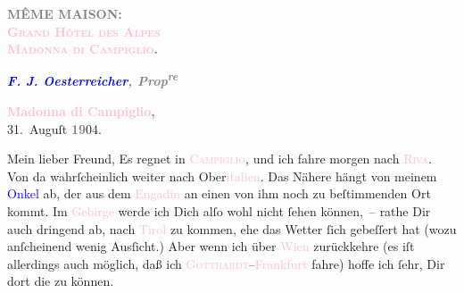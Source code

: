 \pstart
           \textcolor{gray}{\textbf{MÊME MAISON:}}{\\}\textcolor{gray}{\textbf{\textsc{\textcolor{pink}{Grand Hôtel des Alpes}{}\ledrightnote{\textcolor{pink}{Grand Hotel des Alpes}}}}}{\\}\textcolor{gray}{\textbf{\textsc{\textcolor{pink}{Madonna di Campiglio}{}\ledrightnote{\textcolor{pink}{Madonna di Campiglio}}.}}}\pend
           
\pstart
           \textcolor{gray}{\textbf{\emph{\textcolor{blue}{F. J. Oesterreicher}{}\ledrightnote{\textcolor{blue}{Franz Joseph Österreicher}}, Prop\textsuperscript{re}}}}\pend
           
\pstart
           \raggedleft{}\textcolor{gray}{\textbf{\textbf{\textcolor{pink}{Madonna di Campiglio}{}\ledrightnote{\textcolor{pink}{Madonna di Campiglio}}},}}{\\}31. Auguſt \textcolor{gray}{\textbf{19}}04.\pend
           
\pstart\center{}Mein lieber Freund,\pend
\pstart
           Es regnet in \textsc{\textcolor{pink}{Campiglio}{}\ledrightnote{\textcolor{pink}{Madonna di Campiglio}}}, und ich fahre morgen nach \textsc{\textcolor{pink}{Riva}{}\ledrightnote{\textcolor{pink}{Riva del Garda}}}. Von da wahrſcheinlich weiter nach Ober\textcolor{pink}{italien}{}\ledrightnote{\textcolor{pink}{Italien}}. Das Nähere hängt von meinem \textcolor{blue}{Onkel}{}\ledrightnote{{$\rightarrow$}\textcolor{blue}{Fedor Mamroth}} ab, der aus dem \textcolor{pink}{Engadin}{}\ledrightnote{\textcolor{pink}{Engadin}} an einen von ihm noch zu beſtimmenden Ort kommt. Im \textcolor{pink}{Gebirge}{}\ledrightnote{{$\rightarrow$}\textcolor{pink}{Dolomiten}} werde ich Dich alſo wohl nicht
               ſehen können, – rathe Dir auch {\pb}dringend ab, nach \textcolor{pink}{Tirol}{}\ledrightnote{\textcolor{pink}{Tirol}{\newline}\textcolor{pink}{Südtirol}} zu kommen, ehe das Wetter ſich
               gebeſſert hat (wozu anſcheinend wenig Ausſicht.) Aber wenn ich über \textcolor{pink}{Wien}{}\ledrightnote{\textcolor{pink}{Wien}} zurückkehre (es iſt allerdings auch möglich, daß ich \textsc{\textcolor{pink}{Gotthardt}{}\ledrightnote{\textcolor{pink}{Gotthardpass}}}–\textcolor{pink}{Frankfurt}{}\ledrightnote{\textcolor{pink}{Frankfurt am Main}} fahre) hoffe ich ſehr, Dir dort
               die \label{K_L03454-1v}\label{K_L03454-1h} zu können.\pend
           
